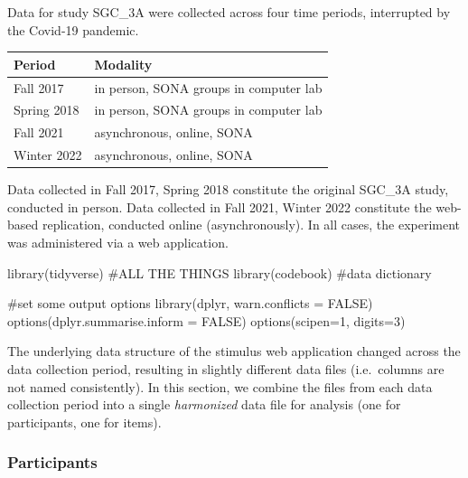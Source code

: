 \documentclass[
  letterpaper,
  DIV=11,
  numbers=noendperiod]{scrreprt}
\newenvironment{Shaded}{\begin{snugshade}}{\end{snugshade}}
\newcommand{\AttributeTok}[1]{\textcolor[rgb]{0.40,0.45,0.13}{#1}}
\newcommand{\CommentTok}[1]{\textcolor[rgb]{0.37,0.37,0.37}{#1}}
\newcommand{\ConstantTok}[1]{\textcolor[rgb]{0.56,0.35,0.01}{#1}}
\newcommand{\DecValTok}[1]{\textcolor[rgb]{0.68,0.00,0.00}{#1}}
\newcommand{\FunctionTok}[1]{\textcolor[rgb]{0.28,0.35,0.67}{#1}}
\newcommand{\NormalTok}[1]{\textcolor[rgb]{0.00,0.23,0.31}{#1}}
\begin{document}
Data for study SGC\_3A were collected across four time periods,
interrupted by the Covid-19 pandemic.

\begin{longtable}[]{@{}ll@{}}
\toprule()
Period & Modality \\
\midrule()
\endhead
Fall 2017 & in person, SONA groups in computer lab \\
Spring 2018 & in person, SONA groups in computer lab \\
Fall 2021 & asynchronous, online, SONA \\
Winter 2022 & asynchronous, online, SONA \\
\bottomrule()
\end{longtable}

Data collected in Fall 2017, Spring 2018 constitute the original SGC\_3A
study, conducted in person. Data collected in Fall 2021, Winter 2022
constitute the web-based replication, conducted online (asynchronously).
In all cases, the experiment was administered via a web application.

\begin{Shaded}
\begin{Highlighting}[]
\FunctionTok{library}\NormalTok{(tidyverse) }\CommentTok{\#ALL THE THINGS}
\FunctionTok{library}\NormalTok{(codebook) }\CommentTok{\#data dictionary}

\CommentTok{\#set some output options}
\FunctionTok{library}\NormalTok{(dplyr, }\AttributeTok{warn.conflicts =} \ConstantTok{FALSE}\NormalTok{)}
\FunctionTok{options}\NormalTok{(}\AttributeTok{dplyr.summarise.inform =} \ConstantTok{FALSE}\NormalTok{)}
\FunctionTok{options}\NormalTok{(}\AttributeTok{scipen=}\DecValTok{1}\NormalTok{, }\AttributeTok{digits=}\DecValTok{3}\NormalTok{)}
\end{Highlighting}
\end{Shaded}

The underlying data structure of the stimulus web application changed
across the data collection period, resulting in slightly different data
files (i.e.~columns are not named consistently). In this section, we
combine the files from each data collection period into a single
\emph{harmonized} data file for analysis (one for participants, one for
items).

\hypertarget{participants}{%
\subsubsection{Participants}\label{participants}}
\end{document}
